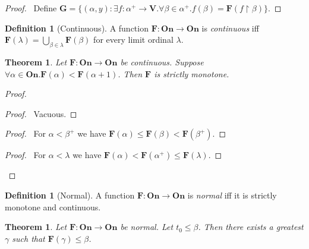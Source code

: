 \documentclass{report}
\let\qed\relax
\newtheorem{theorem}[axiom]{Theorem}
\theoremstyle{definition}
\newtheorem{definition}[axiom]{Definition}
\begin{document}
    \begin{proof}
        \pf\ Define $\mathbf{G} = \{ (\alpha, y) : \exists f : \alpha^+ \rightarrow \mathbf{V}.
        \forall \beta \in \alpha^+. f(\beta) = \mathbf{F}(f \restriction \beta) \}$. \qed
    \end{proof}

    \begin{definition}[Continuous]
        A function $\mathbf{F} : \mathbf{On} \rightarrow \mathbf{On}$ is \emph{continuous} iff
        $\mathbf{F}(\lambda) = \bigcup_{\beta \in \lambda} \mathbf{F}(\beta)$ for every limit ordinal
        $\lambda$.
    \end{definition}

    \begin{theorem}
        Let $\mathbf{F} : \mathbf{On} \rightarrow \mathbf{On}$ be continuous. Suppose
        $\forall \alpha \in \mathbf{On}. \mathbf{F}(\alpha) < \mathbf{F}(\alpha + 1)$.
        Then $\mathbf{F}$ is strictly monotone.
    \end{theorem}

    \begin{proof}
        \pf
        \begin{proof}
            \pf\ Vacuous.
        \end{proof}
        \begin{proof}
            \pf\ For $\alpha < \beta^+$ we have $\mathbf{F}(\alpha) \leq \mathbf{F}(\beta) < \mathbf{F}(\beta^+)$.
        \end{proof}
        \begin{proof}
            \pf\ For $\alpha < \lambda$ we have $\mathbf{F}(\alpha) < \mathbf{F}(\alpha^+) \leq \mathbf{F}(\lambda)$.
        \end{proof}
        \qed
    \end{proof}

    \begin{definition}[Normal]
        A function $\mathbf{F} : \mathbf{On} \rightarrow \mathbf{On}$ is \emph{normal} iff it is
        strictly monotone and continuous.
    \end{definition}

    \begin{theorem}
        Let $\mathbf{F} : \mathbf{On} \rightarrow \mathbf{On}$ be normal. Let $t_0 \leq \beta$.
        Then there exists a greatest $\gamma$ such that $\mathbf{F}(\gamma) \leq \beta$.
    \end{theorem}
\end{document}
